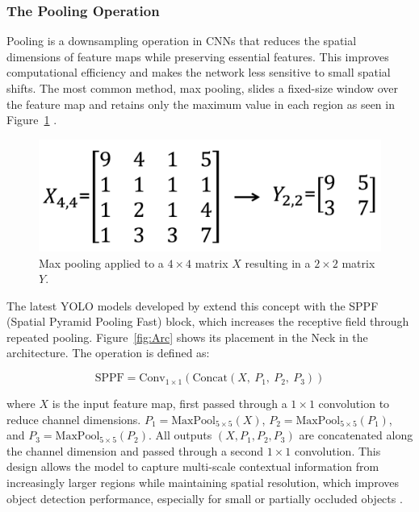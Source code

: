 \documentclass[a4paper,10pt,twocolumn]{article}
\numberwithin{figure}{section}
\numberwithin{table}{section}
\begin{document}
\vspace{0.3cm}
\subsubsection{The Pooling Operation}
\vspace{0.3cm}
Pooling is a downsampling operation in CNNs that reduces the spatial dimensions of feature maps while preserving essential features. 
This improves computational efficiency and makes the network less sensitive to small spatial shifts. 
The most common method, max pooling, slides a fixed-size window over the 
feature map and retains only the maximum value in each region as seen in Figure~\ref{fig:pooling} \cite[p.~163]{prince2023understanding}. 

\begin{figure}[htbp]
    \centering
    \includegraphics[width=0.6\linewidth]{pooling.png} 
    \caption{Max pooling applied to a \(4 \times 4\) matrix \(X\) resulting in a \(2 \times 2\) matrix \(Y\).}
    \label{fig:pooling}  
\end{figure}

The latest YOLO models developed by \cite{ultralytics2025} extend this concept with the SPPF (Spatial Pyramid Pooling Fast) block, which increases the receptive field through repeated pooling. Figure~\ref{fig:Arc} shows its placement in the Neck in the architecture. The operation is defined as:

\begin{equation} 
    \label{eq:sppf} \mathrm{SPPF} = \mathrm{Conv}_{1 \times 1} \left( \mathrm{Concat}(X,\ P_1,\ P_2,\ P_3) \right) \end{equation}
    
    \noindent
where \( X \) is the input feature map, first passed through a \( 1 \times 1 \) convolution to reduce channel dimensions. \( P_1 = \mathrm{MaxPool}_{5 \times 5}(X) \), \( P_2 = \mathrm{MaxPool}_{5 \times 5}(P_1) \), 
and \( P_3 = \mathrm{MaxPool}_{5 \times 5}(P_2) \). All outputs \( (X, P_1, P_2, P_3) \) are concatenated along the channel 
dimension and passed through a second \( 1 \times 1 \) convolution. 
This design allows the model to capture multi-scale contextual information from 
increasingly larger regions while maintaining spatial resolution, 
which improves object detection performance, especially for small or 
partially occluded objects \citep{ultralytics2025}.
\end{document}
